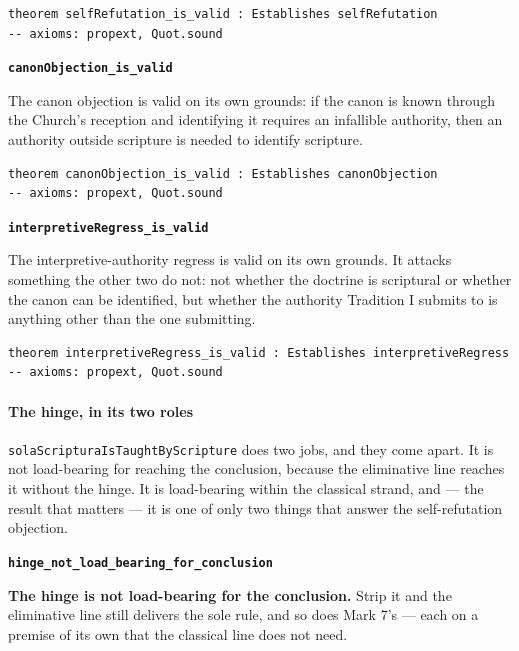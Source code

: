 \documentclass[11pt]{article}
\begin{document}
{\small\begin{verbatim}
theorem selfRefutation_is_valid : Establishes selfRefutation
-- axioms: propext, Quot.sound
\end{verbatim}}
\par\medskip\noindent\textbf{\texttt{canon\allowbreak{}Objection\_\allowbreak{}is\_\allowbreak{}valid}}\par\nobreak\noindent
The canon objection is valid on its own grounds: if the canon is known through the Church’s reception and identifying it requires an infallible authority, then an authority outside scripture is needed to identify scripture.

{\small\begin{verbatim}
theorem canonObjection_is_valid : Establishes canonObjection
-- axioms: propext, Quot.sound
\end{verbatim}}
\par\medskip\noindent\textbf{\texttt{interpretive\allowbreak{}Regress\_\allowbreak{}is\_\allowbreak{}valid}}\par\nobreak\noindent
The interpretive-authority regress is valid on its own grounds. It attacks something the other two do not: not whether the doctrine is scriptural or whether the canon can be identified, but whether the authority Tradition I submits to is anything other than the one submitting.

{\small\begin{verbatim}
theorem interpretiveRegress_is_valid : Establishes interpretiveRegress
-- axioms: propext, Quot.sound
\end{verbatim}}
\paragraph*{The hinge, in its two roles}
\leavevmode\par\nobreak
\texttt{sola\allowbreak{}Scriptura\allowbreak{}Is\allowbreak{}Taught\allowbreak{}By\allowbreak{}Scripture} does two jobs, and they come apart. It is not load-bearing for reaching the conclusion, because the eliminative line reaches it without the hinge. It is load-bearing within the classical strand, and — the result that matters — it is one of only two things that answer the self-refutation objection.

\par\medskip\noindent\textbf{\texttt{hinge\_\allowbreak{}not\_\allowbreak{}load\_\allowbreak{}bearing\_\allowbreak{}for\_\allowbreak{}conclusion}}\par\nobreak\noindent
\textbf{The hinge is not load-bearing for the conclusion.} Strip it and the eliminative line still delivers the sole rule, and so does Mark 7’s — each on a premise of its own that the classical line does not need.
\end{document}
